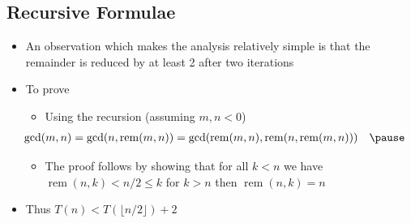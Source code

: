\newcommand{\rem}{\mathop{\mathrm{rem}}}
\begin{slide}
\section{Recursive Formulae}

\begin{PauseHighLight}
  \begin{itemize}
  \item An observation which makes the analysis relatively simple is
    that the remainder is reduced by at least 2 after two iterations\pause
  \item To prove
    \begin{itemize}
    \item Using the recursion (assuming $m,n<0$)
    \begin{align*}
     \hspace{-2em} \gcd(m,n) &= \gcd(n,\rem(m,n)) = \gcd(\rem(m,n),\rem(n,\rem(m,n)))\hspace{1em}\pause
    \end{align*}
    \item The proof follows by showing that for all $k<n$ we have
      $\rem(n,k)<n/2\leq k$ for $k>n$ then $\rem(n,k)=n$\pause
    \end{itemize}
  \item Thus $T(n)<T(\lfloor n/2 \rfloor)+2$\pause
  \end{itemize}
\end{PauseHighLight}

\end{slide}


